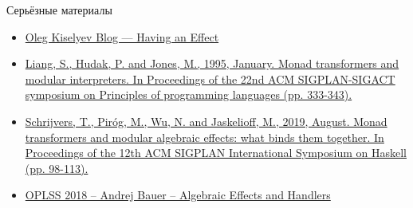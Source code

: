     \begin{frame}[fragile]{Серьёзные материалы}
        \begin{itemize}
            \item \href{https://okmij.org/ftp/Computation/having-effect.html}{\color{blue} Oleg Kiselyev Blog --- Having an Effect}
            \item \href{https://dl.acm.org/doi/pdf/10.1145/199448.199528}{\color{blue} Liang, S., Hudak, P. and Jones, M., 1995, January. Monad transformers and modular interpreters. In Proceedings of the 22nd ACM SIGPLAN-SIGACT symposium on Principles of programming languages (pp. 333-343).}
            \item \href{https://scholar.google.com/scholar?hl=en&as_sdt=0%2C5&q=Monad+Transformers+and+Modular+Algebraic+Effects&btnG=}{\color{blue}Schrijvers, T., Piróg, M., Wu, N. and Jaskelioff, M., 2019, August. Monad transformers and modular algebraic effects: what binds them together. In Proceedings of the 12th ACM SIGPLAN International Symposium on Haskell (pp. 98-113).}
            \item \href{https://www.youtube.com/playlist?list=PLt7hcIEdZLAkebYy70DdBDm2qLrw7ptfp}{\color{blue}  OPLSS 2018 -- Andrej Bauer -- Algebraic Effects and Handlers}
        \end{itemize}
    \end{frame}


